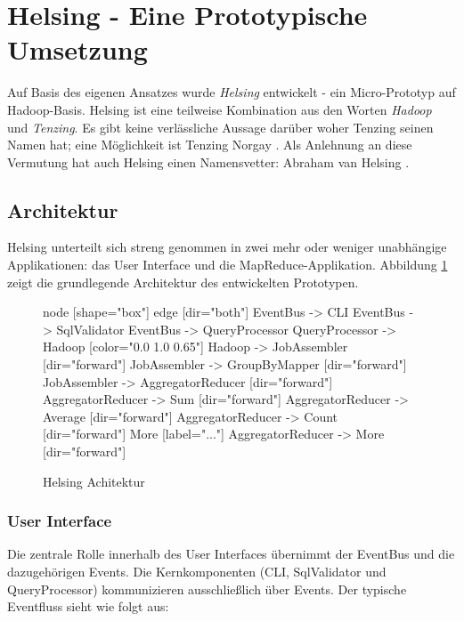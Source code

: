 \documentclass[a4paper]{article}
\begin{document}
\newpage

\section{Helsing - Eine Prototypische Umsetzung}
\label{sec:prototype}

Auf Basis des eigenen Ansatzes wurde \textit{Helsing} entwickelt - ein Micro-Prototyp auf Hadoop-Basis. Helsing ist eine teilweise Kombination aus den Worten \textit{Hadoop} und \textit{Tenzing}. Es gibt keine verlässliche Aussage darüber woher Tenzing seinen Namen hat; eine Möglichkeit ist Tenzing Norgay \cite{TenzingNorgay}. Als Anlehnung an diese Vermutung hat auch Helsing einen Namensvetter: Abraham van Helsing \cite{Helsing}.

\subsection{Architektur}
Helsing unterteilt sich streng genommen in zwei mehr oder weniger unabhängige Applikationen: das User Interface und die MapReduce-Applikation. Abbildung \ref{fig:helsing-architecture} zeigt die grundlegende Architektur des entwickelten Prototypen.

\begin{figure}[H]
\centering
{} {
    node [shape="box"]
    edge [dir="both"]
    EventBus -> CLI
    EventBus -> SqlValidator
    EventBus -> QueryProcessor
    QueryProcessor -> Hadoop [color="0.0 1.0 0.65"]
    Hadoop -> JobAssembler [dir="forward"]
    JobAssembler -> GroupByMapper [dir="forward"]
    JobAssembler -> AggregatorReducer [dir="forward"]
    AggregatorReducer -> Sum [dir="forward"]
    AggregatorReducer -> Average [dir="forward"]
    AggregatorReducer -> Count [dir="forward"]
    More [label="..."]
    AggregatorReducer -> More [dir="forward"]
}
\caption{Helsing Achitektur}
\label{fig:helsing-architecture}
\end{figure}

\subsubsection{User Interface}
Die zentrale Rolle innerhalb des User Interfaces übernimmt der EventBus und die dazugehörigen Events. Die Kernkomponenten (CLI, SqlValidator und QueryProcessor) kommunizieren ausschließlich über Events. Der typische Eventfluss sieht wie folgt aus:
\end{document}
